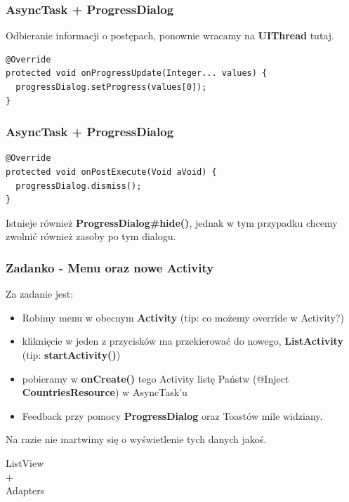 \begin{frame}[fragile]\frametitle{AsyncTask + ProgressDialog}
Odbieranie informacji o postępach, ponownie wracamy na \textbf{UIThread} tutaj.
\begin{lstlisting}
@Override
protected void onProgressUpdate(Integer... values) {
  progressDialog.setProgress(values[0]);
}
\end{lstlisting}
\end{frame}

\begin{frame}[fragile]\frametitle{AsyncTask + ProgressDialog}
\begin{lstlisting}
@Override
protected void onPostExecute(Void aVoid) {
  progressDialog.dismiss();
}
\end{lstlisting}
Istnieje również \textbf{ProgressDialog\#hide()}, jednak w tym 
przypadku chcemy zwolnić również zasoby po tym dialogu.
\end{frame}

\begin{frame}\frametitle{Zadanko - Menu oraz nowe Activity}
Za zadanie jest:
\begin{itemize}
 \item Robimy menu w obecnym \textbf{Activity} (tip: co możemy override w Activity?)
 \pause \item kliknięcie w jeden z przycisków ma przekierować do nowego, \textbf{ListActivity} (tip: \textbf{startActivity()})
 \pause \item pobieramy w \textbf{onCreate()} tego Activity listę Państw (@Inject \textbf{CountriesResource}) w AsyncTask'u
 \pause \item Feedback przy pomocy \textbf{ProgressDialog} oraz Toastów mile widziany.
\end{itemize}
Na razie nie martwimy się o wyświetlenie tych danych jakoś.
\end{frame}


\begin{frame}
\begin{center}
 \Huge{ListView} \\ 
 \Huge{+} \\
 \Huge{Adapters}
\end{center}
\end{frame}

